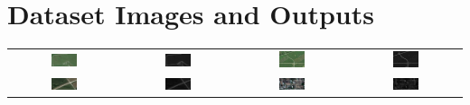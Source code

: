 \documentclass[12pt,a4paper]{article}
\begin{document}
\section{Dataset Images and Outputs}
\begin{tabular}{ c c c c}
 \includegraphics[width=0.25\textwidth]{./pictures/_3.png} & \includegraphics[width=0.25\textwidth]{./pictures/_3.png_final_img.jpg} & \includegraphics[width=0.25\textwidth]{./pictures/_4.png} & \includegraphics[width=0.25\textwidth]{./pictures/_4.png_final_img.jpg}\\
 \includegraphics[width=0.25\textwidth]{./pictures/_5.png} & \includegraphics[width=0.25\textwidth]{./pictures/_5.png_final_img.jpg} & \includegraphics[width=0.25\textwidth]{./pictures/3.png} & \includegraphics[width=0.25\textwidth]{./pictures/3.png_final_img.jpg}\\

\end{tabular}
\end{document}
